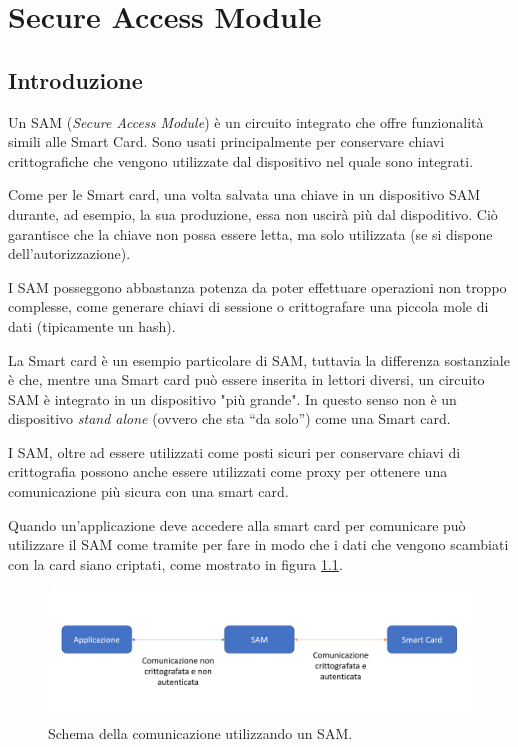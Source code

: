 \chapter{Secure Access Module}
\label{chapter3}

\section{Introduzione}
Un SAM (\textit{Secure Access Module}) è un circuito integrato che offre funzionalità simili alle Smart Card. Sono usati principalmente per conservare chiavi crittografiche che vengono utilizzate dal dispositivo nel quale sono integrati.

Come per le Smart card, una volta salvata una chiave in un dispositivo SAM durante, ad esempio, la sua produzione, essa non uscirà più dal dispoditivo. Ciò garantisce che la chiave non possa essere letta, ma solo utilizzata (se si dispone dell'autorizzazione).

I SAM posseggono abbastanza potenza da poter effettuare operazioni non troppo complesse, come generare chiavi di sessione o crittografare una piccola mole di dati (tipicamente un hash).

La Smart card è un esempio particolare di SAM, tuttavia la differenza sostanziale è che, mentre una Smart card può essere inserita in lettori diversi, un circuito SAM è integrato in un dispositivo "più grande". In questo senso non è un dispositivo \textit{stand alone} (ovvero che sta ``da solo'') come una Smart card.

I SAM, oltre ad essere utilizzati come posti sicuri per conservare chiavi di crittografia possono anche essere utilizzati come proxy per ottenere una comunicazione più sicura con una smart card.

Quando un'applicazione deve accedere alla smart card per comunicare può utilizzare il SAM come tramite per fare in modo che i dati che vengono scambiati con la card siano criptati, come mostrato in figura \ref{fig:proxy_sam}.

\begin{figure}[h!]
  \centering
  \includegraphics[width=410pt]{pictures/proxy_sam.png}
  \caption{Schema della comunicazione utilizzando un SAM.}
  \label{fig:proxy_sam}
\end{figure}

